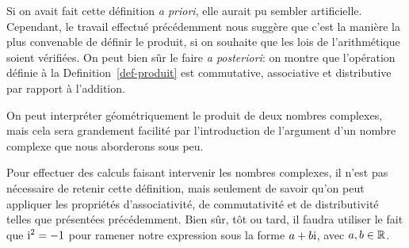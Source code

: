 \documentclass[
  letterpaper,
  DIV=11,
  numbers=noendperiod,
  oneside]{scrreprt}
\theoremstyle{definition}
\theoremstyle{remark}
\begin{document}
Si on avait fait cette définition \emph{a priori}, elle aurait pu
sembler artificielle. Cependant, le travail effectué précédemment nous
suggère que c'est la manière la plus convenable de définir le produit,
si on souhaite que les lois de l'arithmétique soient vérifiées. On peut
bien sûr le faire \emph{a posteriori}: on montre que l'opération définie
à la Definition~\ref{def-produit} est commutative, associative et
distributive par rapport à l'addition.


On peut interpréter géométriquement le produit de deux nombres
complexes, mais cela sera grandement facilité par l'introduction de
l'argument d'un nombre complexe que nous aborderons sous peu.

Pour effectuer des calculs faisant intervenir les nombres complexes, il
n'est pas nécessaire de retenir cette définition, mais seulement de
savoir qu'on peut appliquer les propriétés d'associativité, de
commutativité et de distributivité telles que présentées précédemment.
Bien sûr, tôt ou tard, il faudra utiliser le fait que \(\textrm{i}^2=-1\) pour
ramener notre expression sous la forme \(a+b\textrm{i}\), avec \(a,b\in\mathbb{R}\).
\end{document}
